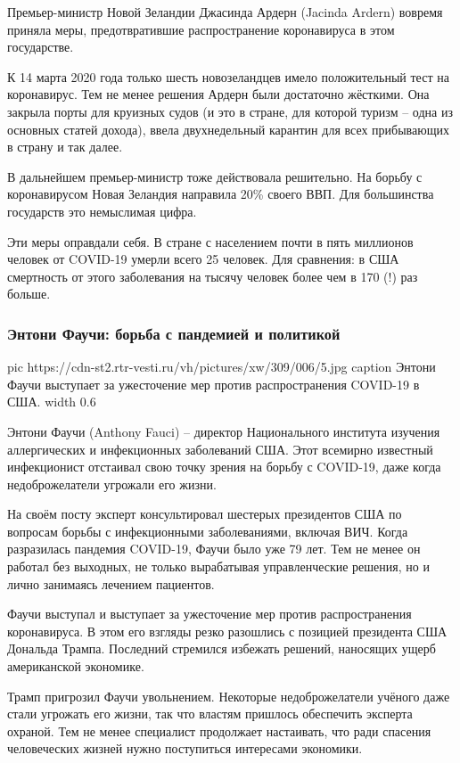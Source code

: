 Премьер-министр Новой Зеландии Джасинда Ардерн (Jacinda Ardern) вовремя приняла
меры, предотвратившие распространение коронавируса в этом государстве.

К 14 марта 2020 года только шесть новозеландцев имело положительный тест на
коронавирус. Тем не менее решения Ардерн были достаточно жёсткими. Она закрыла
порты для круизных судов (и это в стране, для которой туризм – одна из основных
статей дохода), ввела двухнедельный карантин для всех прибывающих в страну и
так далее.

В дальнейшем премьер-министр тоже действовала решительно. На борьбу с
коронавирусом Новая Зеландия направила 20\% своего ВВП. Для большинства
государств это немыслимая цифра.

Эти меры оправдали себя. В стране с населением почти в пять миллионов человек
от COVID-19 умерли всего 25 человек. Для сравнения: в США смертность от этого
заболевания на тысячу человек более чем в 170 (!) раз больше.

\subsubsection{Энтони Фаучи: борьба с пандемией и политикой}


\ifcmt
  pic https://cdn-st2.rtr-vesti.ru/vh/pictures/xw/309/006/5.jpg
	caption Энтони Фаучи выступает за ужесточение мер против распространения COVID-19 в США.
	width 0.6
\fi

Энтони Фаучи (Anthony Fauci) – директор Национального института изучения
аллергических и инфекционных заболеваний США. Этот всемирно известный
инфекционист отстаивал свою точку зрения на борьбу с COVID-19, даже когда
недоброжелатели угрожали его жизни.

На своём посту эксперт консультировал шестерых президентов США по вопросам
борьбы с инфекционными заболеваниями, включая ВИЧ. Когда разразилась пандемия
COVID-19, Фаучи было уже 79 лет. Тем не менее он работал без выходных, не
только вырабатывая управленческие решения, но и лично занимаясь лечением
пациентов.

Фаучи выступал и выступает за ужесточение мер против распространения
коронавируса. В этом его взгляды резко разошлись с позицией президента США
Дональда Трампа. Последний стремился избежать решений, наносящих ущерб
американской экономике.

Трамп пригрозил Фаучи увольнением. Некоторые недоброжелатели учёного даже стали
угрожать его жизни, так что властям пришлось обеспечить эксперта охраной. Тем
не менее специалист продолжает настаивать, что ради спасения человеческих
жизней нужно поступиться интересами экономики.

